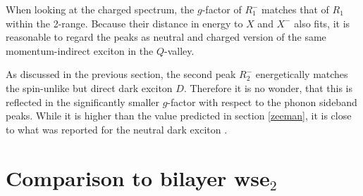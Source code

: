 When looking at the charged spectrum, the $g$-factor of $R_1^-$ matches that of $R_1$ within the 2\sigma-range. Because their distance in energy to $X$ and $X^-$ also fits, it is reasonable to regard the peaks as neutral and charged version of the same momentum-indirect exciton in the $Q$-valley.

As discussed in the previous section, the second peak $R_2^-$ energetically matches the spin-unlike but direct dark exciton $D$. Therefore it is no wonder, that this is reflected in the significantly smaller $g$-factor with respect to the phonon sideband peaks. While it is higher than the value predicted in section \ref{zeeman}, it is close to what was reported for the neutral dark exciton \cite{robert_fine_2017}.

\section{Comparison to bilayer ws\textup{e}$_2$}

